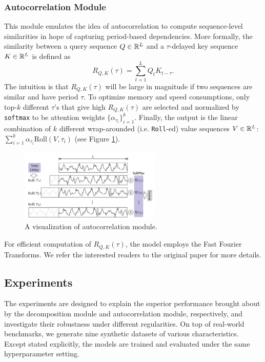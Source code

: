 \subsubsection{Autocorrelation Module}
This module emulates the idea of autocorrelation to compute sequence-level similarities in hope of capturing period-based dependencies. 
More formally, the similarity between a query sequence $Q \in \mathbb{R}^{L}$ and a $\tau$-delayed key sequence $K \in \mathbb{R}^{L}$ is defined as $$R_{Q, K}(\tau) = \sum_{t = 1}^L Q_tK_{t - \tau}.$$
The intuition is that $R_{Q, K}(\tau)$ will be large in magnitude if two sequences are similar and have period $\tau$. 
To optimize memory and speed consumptions, only top-$k$ different $\tau$'s that give high $R_{Q, K}(\tau)$ are selected and normalized by \texttt{softmax} to be attention weights $\{\alpha_{\tau_i}\}_{i = 1}^k$. 
Finally, the output is the linear combination of $k$ different wrap-arounded (i.e. \texttt{Roll}-ed) value sequences $V \in \mathbb{R}^{L}$: $\sum_{i = 1}^k \alpha_{\tau_i} \text{Roll}(V, \tau_i)$ (see Figure \ref{fig:autocorrelation}). 

\begin{figure}
    \centering
    \includegraphics[width=0.6\textwidth]{img/autocorrelation.png}
    \caption{A visualization of autocorrelation module.}
    \label{fig:autocorrelation}
\end{figure}

For efficient computation of $R_{Q, K}(\tau)$, the model employs the Fast Fourier Transforms. 
We refer the interested readers to the original paper for more details. 

\subsection{Experiments}
The experiments are designed to explain the superior performance brought about by the decomposition module and autocorrelation module, respectively, and investigate their robustness under different regularities. 
On top of real-world benchmarks, we generate nine synthetic datasets of various characteristics. 
Except stated explicitly, the models are trained and evaluated under the same hyperparameter setting. 


